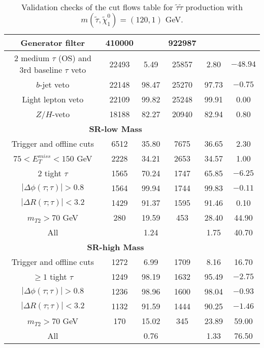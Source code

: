 \documentclass[12pt,A4paper,pdftex, ]{article}
\begin{document}
\begin{table}[h!]
\begin{center}
\begin{tabular}{|c|c|c|c|c|c|}
Generator filter & 410000 &  & 922987 &  & \\ \hline
2 medium $\tau$ (OS) and 3rd baseline $\tau$ veto & 22493 & 5.49 & 25857 & 2.80 & $-48.94$ \\ \hline
$b$-jet veto & 22148 & 98.47 & 25270 & 97.73 & $-0.75$ \\ \hline
Light lepton veto & 22109 & 99.82 & 25248 & 99.91 & 0.00 \\ \hline
$Z/H$-veto & 18188 & 82.27 & 20940 & 82.94 & 0.80 \\ \hline
%
\multicolumn{5}{|c|}{ \textbf{SR-low Mass} }\\\hline
%
Trigger and offline cuts & 6512 & 35.80 & 7675 & 36.65 & 2.30 \\ \hline
$ 75 < E^{miss}_T < 150 $ GeV & 2228 & 34.21 & 2653 & 34.57 & 1.00 \\ \hline
2 tight $\tau$ & 1565 & 70.24 & 1747 & 65.85 & $-6.25$ \\ \hline
$ |\Delta\phi(\tau;\tau)| > 0.8 $ & 1564 & 99.94 & 1744 & 99.83 & $-0.11$ \\ \hline
$ |\Delta R(\tau;\tau)| < 3.2 $ & 1429 & 91.37 & 1595 & 91.46 & 0.10 \\ \hline
$ m_{T2} > 70 $ GeV & 280 & 19.59 & 453 & 28.40 & 44.90 \\ \hline
All &  & 1.24 &  & 1.75 & 40.70 \\ \hline
%
\hline
\multicolumn{5}{|c|}{ \textbf{SR-high Mass} }\\\hline
%
Trigger and offline cuts & 1272 & 6.99 & 1709 & 8.16 & 16.70 \\ \hline
$ \geq 1 $ tight $\tau$ & 1249 & 98.19 & 1632 & 95.49 & $-2.75$ \\ \hline
$ |\Delta\phi(\tau;\tau)| > 0.8 $ & 1236 & 98.96 & 1600 & 98.04 & $-0.93$ \\ \hline
$ |\Delta R(\tau;\tau)| < 3.2 $ & 1132 & 91.59 & 1444 & 90.25 & $-1.46$ \\ \hline
$ m_{T2} > 70 $ GeV & 170 & 15.02 & 345 & 23.89 & 59.00 \\ \hline
All &  & 0.76 &  & 1.33 & 76.50 \\ \hline

\end{tabular}
\end{center}
\caption{Validation checks of the cut flows table for $ \tilde{\tau}\tilde{\tau} $ production with $ m(\tilde{\tau},\tilde{\chi}^0_1) = (120,1) $ GeV.}
\label{120GeV}
\end{table} 
\end{document}

